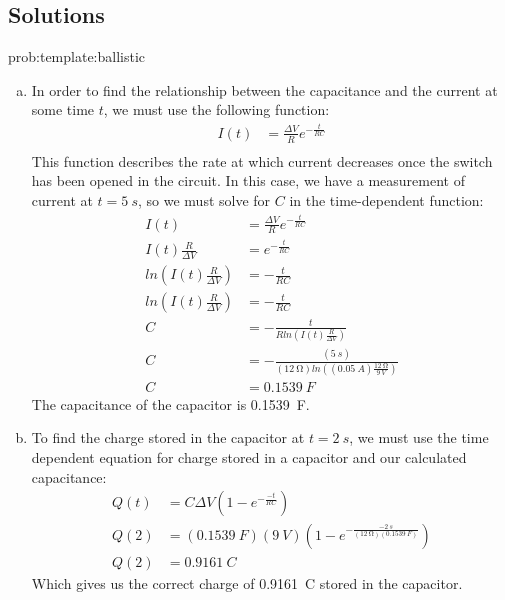 \subsection{Solutions}
\begin{solution}{prob:template:ballistic}\label{soln:template:ballistic}
	\begin{enumerate}[(a)]
		\item In order to find the relationship between the capacitance and the current at some time $t$, we must use the following function:
		\begin{align*}
		I(t) &= \frac{\Delta V}{R}e^{-\frac{t}{RC}}\\
		\end{align*}
		This function describes the rate at which current decreases once the switch has been opened in the circuit. In this case, we have a measurement of current at $t = \SI{5}{s}$, so we must solve for $C$ in the time-dependent function:
		\begin{align*}
		I(t) &= \frac{\Delta V}{R}e^{-\frac{t}{RC}}\\
		I(t)\frac{R}{\Delta V} &= e^{-\frac{t}{RC}}\\
		ln(I(t)\frac{R}{\Delta V}) &= -\frac{t}{RC}\\
		ln(I(t)\frac{R}{\Delta V}) &= -\frac{t}{RC}\\
		C & =  -\frac{t}{Rln(I(t)\frac{R}{\Delta V})}\\
		C & = -\frac{(\SI{5}{s})}{(\SI{12}{\ohm})ln((\SI{0.05}{A})\frac{\SI{12}{\ohm}}{\SI{9}{V}})}\\
		C & = \SI{0.1539}{F}
		\end{align*}
		The capacitance of the capacitor is \SI{0.1539}{F}.
		
		\item To find the charge stored in the capacitor at $t = \SI{2}{s}$, we must use the time dependent equation for charge stored in a capacitor and our calculated capacitance:
		\begin{align*}
		Q(t) & = C \Delta V (1-e^{-\frac{-t}{RC}})\\
		Q(2) &= (\SI{0.1539}{F}) (\SI{9}{V}) (1-e^{-\frac{-\SI{2}{s}}{(\SI{12}{\ohm})(\SI{0.1539}{F})}})\\
		Q(2) &= \SI{0.9161}{C}
		\end{align*}
		Which gives us the correct charge of \SI{0.9161}{C} stored in the capacitor.
\end{enumerate}
\end{solution}



